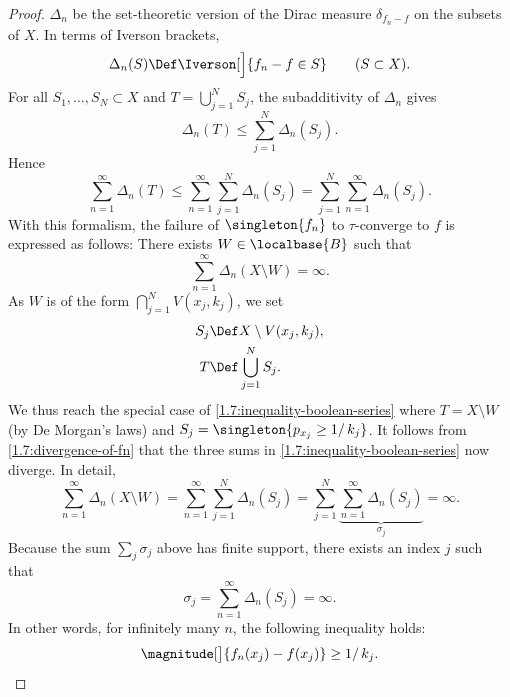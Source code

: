 \begin{proof}
$\Delta_n$ be the set-theoretic version of the Dirac measure $\delta_{f_n - f}$ on the subsets of $X$. In terms of Iverson %
brackets,  
%
\begin{equation}
  \Delta_n(S) \Def \Iverson[\Big]{f_n - f \in S} \qquad (S \subset X).
\end{equation}
%
For all $S_1, \dots, S_N \subset X$ and $T = \bigcup_{j=1}^N S_j$, the subadditivity of $\Delta_n$ gives
%
\begin{equation}
  \Delta_n(T) \leq \sum_{j=1}^N \Delta_n(S_j).
\end{equation}
%
Hence
%
\begin{equation}\label{1.7:inequality-boolean-series}
  \sum_{n=1}^\infty \Delta_n(T) \leq %
  \sum_{n=1}^\infty \sum_{j=1}^N \Delta_n(S_j) = %
  \sum_{j=1}^N \sum_{n=1}^\infty \Delta_n(S_j).
\end{equation}
%
With this formalism, the failure of $\singleton{f_n}$ to $\tau$-converge to $f$ is expressed as follows: There exists %
$W \in \localbase{B}$ such that
%
\begin{equation}\label{1.7:divergence-of-fn}
  \sum_{n=1}^\infty \Delta_n(X \setminus W) = \infty.
\end{equation}
%
As $W$ is of the form $\bigcap_{j=1}^N V(x_j, k_j)$, we set
%
\begin{align}
  S_j &\Def X \setminus V(x_j, k_j), \\
  T   &\Def \bigcup_{j=1}^N S_j. \nonumber
\end{align}
%
We thus reach the special case of \eqref{1.7:inequality-boolean-series} where $T = X \setminus W$ (by De Morgan's laws) and 
$S_j = \singleton{p_{x_j} \geq 1/\,k_j}$. It follows from \eqref{1.7:divergence-of-fn} that the three sums in %
\eqref{1.7:inequality-boolean-series} now diverge. In detail, 
%
\begin{equation}
  \sum_{n=1}^\infty \Delta_n(X \setminus W) = %
  \sum_{n=1}^\infty \sum_{j=1}^N \Delta_n(S_j) = %
  \sum_{j=1}^N \underbrace{\sum_{n=1}^\infty \Delta_n(S_j)}_{\sigma_j} = \infty. 
\end{equation}
%
Because the sum $\sum_j \sigma_j$ above has finite support, there exists an index $j$ such that
%
\begin{equation}
  \sigma_j = \sum_{n=1}^\infty \Delta_n(S_j) = \infty. 
\end{equation}
%
In other words, for infinitely many $n$, the following inequality holds: 
%
\begin{equation}
  \magnitude[\big]{f_n(x_j) - f(x_j)} \geq 1/\,k_j.
\end{equation}

\end{proof}
